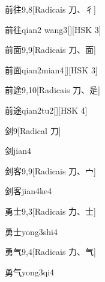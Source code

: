 \begin{entry}{前往}{9,8}[Radicais ⼑、⼻]
  \begin{phonetics}{前往}{qian2 wang3}[][HSK 3]
  \end{phonetics}
\end{entry}

\begin{entry}{前面}{9,9}[Radicais ⼑、⾯]
  \begin{phonetics}{前面}{qian2mian4}[][HSK 3]
  \end{phonetics}
\end{entry}

\begin{entry}{前途}{9,10}[Radicais ⼑、⾡]
  \begin{phonetics}{前途}{qian2tu2}[][HSK 4]
  \end{phonetics}
\end{entry}

\begin{entry}{剑}{9}[Radical ⼑]
  \begin{phonetics}{剑}{jian4}
  \end{phonetics}
\end{entry}

\begin{entry}{剑客}{9,9}[Radicais ⼑、⼧]
  \begin{phonetics}{剑客}{jian4ke4}
  \end{phonetics}
\end{entry}

\begin{entry}{勇士}{9,3}[Radicais ⼒、⼠]
  \begin{phonetics}{勇士}{yong3shi4}
  \end{phonetics}
\end{entry}

\begin{entry}{勇气}{9,4}[Radicais ⼒、⽓]
  \begin{phonetics}{勇气}{yong3qi4}
  \end{phonetics}
\end{entry}

